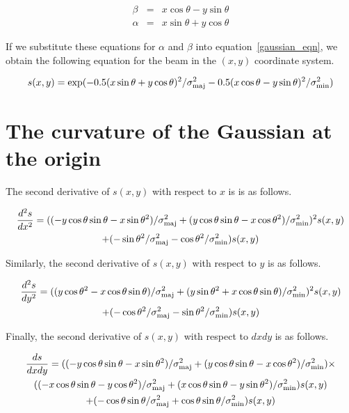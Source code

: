 \documentclass[11pt]{article}
\newcommand{\bpa}{\theta}
\newcommand{\minor}{\sigma_{\mbox{\scriptsize min}}}
\newcommand{\major}{\sigma_{\mbox{\scriptsize maj}}}
\begin{document}
\begin{eqnarray}
  \beta &=&  x\cos{\bpa} - y\sin{\bpa} \\
  \alpha &=&  x\sin{\bpa} + y\cos{\bpa}
\end{eqnarray}

If we substitute these equations for $\alpha$ and $\beta$ into
equation~\ref{gaussian_eqn}, we obtain the following equation for the
beam in the $(x,y)$ coordinate system.

\begin{equation}
\label{beam_xy_eqn}
    s(x,y) = \exp(-0.5 (x\sin{\bpa} + y\cos{\bpa})^2 / \major^2
                  -0.5 (x\cos{\bpa} - y\sin{\bpa})^2 / \minor^2)
\end{equation}

\section{The curvature of the Gaussian at the origin}

The second derivative of $s(x,y)$ with respect to $x$ is is as follows.

\begin{multline}
    \frac{d^2s}{d x^2} = ( (-y\cos{\bpa}\sin{\bpa} - x\sin{\bpa}^2) / \major^2 +
                           ( y\cos{\bpa}\sin{\bpa} - x\cos{\bpa}^2) / \minor^2
              )^2  s(x,y)\\ + (-\sin{\bpa}^2/\major^2 - \cos{\bpa}^2/\minor^2)  s(x,y)
\end{multline}

Similarly, the second derivative of $s(x,y)$ with respect to $y$ is as follows.

\begin{multline}
    \frac{d^2s}{d y^2} = ( (y\cos{\bpa}^2 - x\cos{\bpa}\sin{\bpa}) / \major^2 +
                (y\sin{\bpa}^2 + x\cos{\bpa}\sin{\bpa}) / \minor^2
              )^2  s(x,y)\\ + (-\cos{\bpa}^2/\major^2 - \sin{\bpa}^2/\minor^2)  s(x,y)
\end{multline}

Finally, the second derivative of $s(x,y)$ with respect to $dx dy$ is
as follows.

\begin{multline}
      \frac{ds}{dx dy} = ((-y\cos{\bpa}\sin{\bpa} - x\sin{\bpa}^2) / \major^2 +
                 ( y\cos{\bpa}\sin{\bpa} - x\cos{\bpa}^2) / \minor^2
                )\times \\ ((-x\cos{\bpa}\sin{\bpa} - y\cos{\bpa}^2) / \major^2 +
                     ( x\cos{\bpa}\sin{\bpa} - y\sin{\bpa}^2) / \minor^2
                    ) s(x,y)\\ + (-\cos{\bpa}\sin{\bpa} / \major^2 + \cos{\bpa}\sin{\bpa}/\minor^2) s(x,y)
\end{multline}
\end{document}
